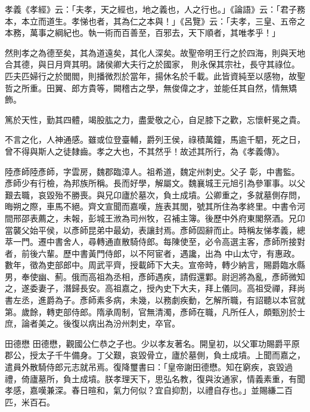 
\begin{pinyinscope}

 孝義《孝經》云：「夫孝，天之經也，地之義也，人之行也。」《論語》云：「君子務本，本立而道生。孝悌也者，其為仁之本與！」《呂覽》云：「夫孝，三皇、五帝之本務，萬事之綱紀也。執一術而百善至，百邪去，天下順者，其唯孝乎！」



 然則孝之為德至矣，其為道遠矣，其化人深矣。故聖帝明王行之於四海，則與天地合其德，與日月齊其明。諸侯卿大夫行之於國家，
 則永保其宗社，長守其祿位。匹夫匹婦行之於閭閻，則播微烈於當年，揚休名於千載。此皆資純至以感物，故聖哲之所重。田翼、郎方貴等，闕稽古之學，無俊偉之才，並能任其自然，情無矯飾。



 篤於天性，勤其四體，竭股肱之力，盡愛敬之心，自足膝下之歡，忘懷軒冕之貴。



 不言之化，人神通感。雖或位登臺輔，爵列王侯，祿積萬鐘，馬逾千駟，死之日，曾不得與斯人之徒隸齒。孝之大也，不其然乎！故述其所行，為《孝義傳》。



 陸彥師陸彥師，字雲房，魏郡臨漳人。祖希道，魏定州刺史。父子
 彰，中書監。彥師少有行檢，為邦族所稱。長而好學，解屬文。魏襄城王元旭引為參軍事。以父艱去職，哀毀殆不勝喪。與兄卬廬於墓次，負土成墳。公卿重之，多就墓側存問，晦朔之際，車馬不絕。齊文宣聞而嘉嘆，旌表其閭，號其所住為孝終里。中書令河間邢邵表薦之，未報，彭城王浟為司州牧，召補主簿。後歷中外府東閣祭酒。兄卬當襲父始平侯，以彥師昆弟中最幼，表讓封焉。彥師固辭而止。時稱友悌孝義，總萃一門。遷中書舍人，尋轉通直散騎侍郎。每陳使至，必令高選主客，彥師所接對者，前後六輩。歷中書黃門侍郎，以不阿宦者，遇讒，出為
 中山太守，有惠政。數年，徵為吏部郎中。周武平齊，授載師下大夫。宣帝時，轉少納言，賜爵臨水縣男，奉使幽、薊。俄而高祖為丞相，彥師遇疾，請假還鄴。尉迥將為亂，彥師微知之，遂委妻子，潛歸長安。高祖嘉之，授內史下大夫，拜上儀同。高祖受禪，拜尚書左丞，進爵為子。彥師素多病，未幾，以務劇疾動，乞解所職，有詔聽以本官就第。歲餘，轉吏部侍郎。隋承周制，官無清濁，彥師在職，凡所任人，頗甄別於士庶，論者美之。後復以病出為汾州刺史，卒官。



 田德懋
 田德懋，觀國公仁恭之子也。少以孝友著名。開皇初，以父軍功賜爵平原郡公，授太子千牛備身。丁父艱，哀毀骨立，廬於墓側，負土成墳。上聞而嘉之，遣員外散騎侍郎元志就吊焉。復降璽書曰：「皇帝謝田德懋。知在窮疾，哀毀過禮，倚廬墓所，負土成墳。朕孝理天下，思弘名教，復與汝通家，情義素重，有聞孝感，嘉嘆兼深。春日暄和，氣力何似？宜自抑割，以禮自存也。」並賜縑二百匹，米百石。




\end{pinyinscope}
